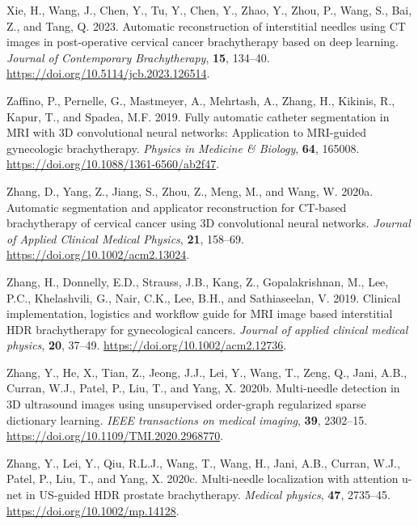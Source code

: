 \documentclass[
  11pt,
]{article}
\newlength{\cslhangindent}
\newenvironment{CSLReferences}[2] %
 {\begin{list}{}{%
  \setlength{\itemindent}{0pt}
  \setlength{\leftmargin}{0pt}
  \setlength{\parsep}{0pt}
  \ifodd #1
   \setlength{\leftmargin}{\cslhangindent}
   \setlength{\itemindent}{-1\cslhangindent}
  \fi
  \setlength{\itemsep}{#2\baselineskip}}}
 {\end{list}}
\begin{document}
\begin{CSLReferences}{1}{1}
Xie, H., Wang, J., Chen, Y., Tu, Y., Chen, Y., Zhao, Y., Zhou, P., Wang,
S., Bai, Z., and Tang, Q. 2023. Automatic reconstruction of interstitial
needles using {CT} images in post-operative cervical cancer
brachytherapy based on deep learning. \emph{Journal of Contemporary
Brachytherapy}, \textbf{15}, 134--40.
\url{https://doi.org/10.5114/jcb.2023.126514}.

Zaffino, P., Pernelle, G., Mastmeyer, A., Mehrtash, A., Zhang, H.,
Kikinis, R., Kapur, T., and Spadea, M.F. 2019. Fully automatic catheter
segmentation in {MRI} with {3D} convolutional neural networks:
Application to {MRI}-guided gynecologic brachytherapy. \emph{Physics in
Medicine \& Biology}, \textbf{64}, 165008.
\url{https://doi.org/10.1088/1361-6560/ab2f47}.

Zhang, D., Yang, Z., Jiang, S., Zhou, Z., Meng, M., and Wang, W. 2020a.
Automatic segmentation and applicator reconstruction for {CT}-based
brachytherapy of cervical cancer using {3D} convolutional neural
networks. \emph{Journal of Applied Clinical Medical Physics},
\textbf{21}, 158--69. \url{https://doi.org/10.1002/acm2.13024}.

Zhang, H., Donnelly, E.D., Strauss, J.B., Kang, Z., Gopalakrishnan, M.,
Lee, P.C., Khelashvili, G., Nair, C.K., Lee, B.H., and Sathiaseelan, V.
2019. Clinical implementation, logistics and workflow guide for MRI
image based interstitial HDR brachytherapy for gynecological cancers.
\emph{Journal of applied clinical medical physics}, \textbf{20}, 37--49.
\url{https://doi.org/10.1002/acm2.12736}.

Zhang, Y., He, X., Tian, Z., Jeong, J.J., Lei, Y., Wang, T., Zeng, Q.,
Jani, A.B., Curran, W.J., Patel, P., Liu, T., and Yang, X. 2020b.
Multi-needle detection in 3D ultrasound images using unsupervised
order-graph regularized sparse dictionary learning. \emph{IEEE
transactions on medical imaging}, \textbf{39}, 2302--15.
\url{https://doi.org/10.1109/TMI.2020.2968770}.

Zhang, Y., Lei, Y., Qiu, R.L.J., Wang, T., Wang, H., Jani, A.B., Curran,
W.J., Patel, P., Liu, T., and Yang, X. 2020c. Multi-needle localization
with attention u-net in US-guided HDR prostate brachytherapy.
\emph{Medical physics}, \textbf{47}, 2735--45.
\url{https://doi.org/10.1002/mp.14128}.


\end{CSLReferences}
\end{document}
